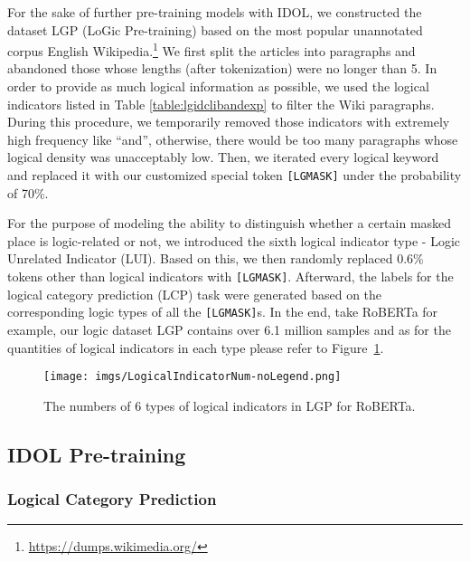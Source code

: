 \documentclass[11pt]{article}
\begin{document}
For the sake of further pre-training models with IDOL, we constructed the dataset LGP (LoGic Pre-training) based on the most popular unannotated corpus English Wikipedia.\footnote{\url{https://dumps.wikimedia.org/}} We first split the articles into paragraphs and abandoned those whose lengths (after tokenization) were no longer than 5. In order to provide as much logical information as possible, we used the logical indicators listed in Table \ref{table:lgidclibandexp} to filter the Wiki paragraphs. During this procedure, we temporarily removed those indicators with extremely high frequency like ``and'', otherwise, there would be too many paragraphs whose logical density was unacceptably low. Then, we iterated every logical keyword and replaced it with our customized special token \texttt{[LGMASK]} under the probability of 70\%. 

For the purpose of modeling the ability to distinguish whether a certain masked place is logic-related or not, we introduced the sixth logical indicator type - Logic Unrelated Indicator (LUI). Based on this, we then randomly replaced 0.6\% tokens other than logical indicators with \texttt{[LGMASK]}. Afterward, the labels for the logical category prediction (LCP) task were generated based on the corresponding logic types of all the \texttt{[LGMASK]}s. In the end, take RoBERTa \cite{roberta} for example, our logic dataset LGP contains over 6.1 million samples and as for the quantities of logical indicators in each type please refer to Figure~\ref{fig:lgplgmasknum}.



\begin{figure}
\centering
\texttt{[image: imgs/LogicalIndicatorNum-noLegend.png]}
\caption{The numbers of 6 types of logical indicators in LGP for RoBERTa.}
\label{fig:lgplgmasknum}
\end{figure}











\subsection{IDOL Pre-training}

\subsubsection{Logical Category Prediction} 
\end{document}
